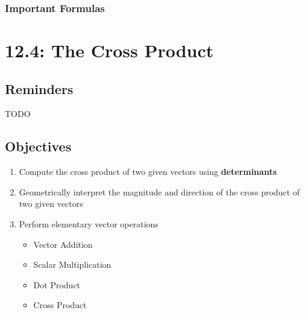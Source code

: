 \documentclass{report}
\begin{document}
\begin{sloppypar}
\subsection{Important Formulas}
\begin{center}
\end{center}

\chapter{12.4: The Cross Product}
\section{Reminders}
TODO
\section{Objectives}
\begin{enumerate}
  \item Compute the cross product of two given
        vectors using \textbf{determinants}
  \item Geometrically interpret the
        magnitude and direction of the cross product
        of two given vectors
  \item Perform elementary vector operations
        \begin{itemize}
          \item Vector Addition
          \item Scalar Multiplication
          \item Dot Product
                \item Cross Product
        \end{itemize}


\end{enumerate}
\end{sloppypar}
\end{document}
